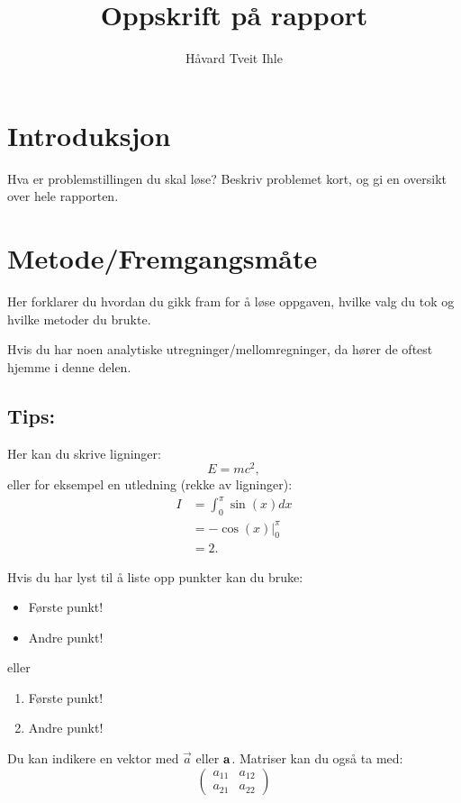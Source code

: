 \documentclass[a4paper,10pt]{article}
\title{Oppskrift på rapport}
\author{Håvard Tveit Ihle}
\date{}
\begin{document}
\maketitle

\section{Introduksjon}

Hva er problemstillingen du skal løse? Beskriv problemet kort, og gi en oversikt over hele rapporten. 

\section{Metode/Fremgangsmåte}

Her forklarer du hvordan du gikk fram for å løse oppgaven, hvilke valg du tok og hvilke metoder du brukte. 

Hvis du har noen analytiske utregninger/mellomregninger, da hører de oftest hjemme i denne delen. 

\subsection{Tips:}

Her kan du skrive ligninger:
\begin{equation}
 E = mc^2,
\end{equation}
eller for eksempel en utledning (rekke av ligninger):
\begin{align}
  I &= \int_0^\pi \sin(x) dx \\ 
    &= -\cos(x)\Big|_0^\pi\\
    &= 2.
\end{align}

Hvis du har lyst til å liste opp punkter kan du bruke:
\begin{itemize}
\item Første punkt!
\item Andre punkt!
\end{itemize}
eller
\begin{enumerate}
\item Første punkt!
\item Andre punkt!
\end{enumerate}

Du kan indikere en vektor med $\vec a$ eller ${\bf a}$. Matriser kan du også ta med:
\begin{equation}
 \left( \begin{array}{cc}
a_{11} & a_{12} \\
a_{21} & a_{22} \end{array} \right)
\end{equation}
\end{document}
